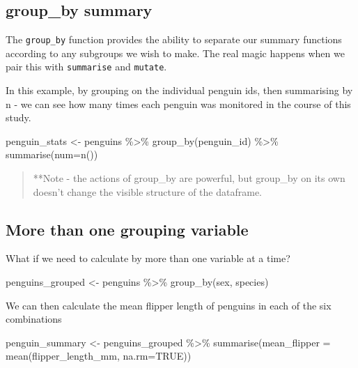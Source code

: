 \documentclass[
]{book}
\newenvironment{Shaded}{\begin{snugshade}}{\end{snugshade}}
\newcommand{\AttributeTok}[1]{\textcolor[rgb]{0.77,0.63,0.00}{#1}}
\newcommand{\ConstantTok}[1]{\textcolor[rgb]{0.00,0.00,0.00}{#1}}
\newcommand{\FunctionTok}[1]{\textcolor[rgb]{0.00,0.00,0.00}{#1}}
\newcommand{\NormalTok}[1]{#1}
\newcommand{\OtherTok}[1]{\textcolor[rgb]{0.56,0.35,0.01}{#1}}
\newcommand{\SpecialCharTok}[1]{\textcolor[rgb]{0.00,0.00,0.00}{#1}}
\begin{document}
\hypertarget{group_by-summary}{%
\subsection{group\_by summary}\label{group_by-summary}}

The \texttt{group\_by} function provides the ability to separate our summary functions according to any subgroups we wish to make. The real magic happens when we pair this with \texttt{summarise} and \texttt{mutate}.

In this example, by grouping on the individual penguin ids, then summarising by n - we can see how many times each penguin was monitored in the course of this study.

\begin{Shaded}
\begin{Highlighting}[]
\NormalTok{penguin\_stats }\OtherTok{\textless{}{-}}\NormalTok{ penguins }\SpecialCharTok{\%\textgreater{}\%} 
  \FunctionTok{group\_by}\NormalTok{(penguin\_id) }\SpecialCharTok{\%\textgreater{}\%} 
  \FunctionTok{summarise}\NormalTok{(}\AttributeTok{num=}\FunctionTok{n}\NormalTok{())}
\end{Highlighting}
\end{Shaded}

\begin{quote}
**Note - the actions of group\_by are powerful, but group\_by on its own doesn't change the visible structure of the dataframe.
\end{quote}

\hypertarget{more-than-one-grouping-variable}{%
\subsection{More than one grouping variable}\label{more-than-one-grouping-variable}}

What if we need to calculate by more than one variable at a time?

\begin{Shaded}
\begin{Highlighting}[]
\NormalTok{penguins\_grouped }\OtherTok{\textless{}{-}}\NormalTok{ penguins }\SpecialCharTok{\%\textgreater{}\%} 
  \FunctionTok{group\_by}\NormalTok{(sex, species)}
\end{Highlighting}
\end{Shaded}

We can then calculate the mean flipper length of penguins in each of the six combinations

\begin{Shaded}
\begin{Highlighting}[]
\NormalTok{penguin\_summary }\OtherTok{\textless{}{-}}\NormalTok{ penguins\_grouped }\SpecialCharTok{\%\textgreater{}\%} 
\FunctionTok{summarise}\NormalTok{(}\AttributeTok{mean\_flipper =} \FunctionTok{mean}\NormalTok{(flipper\_length\_mm, }\AttributeTok{na.rm=}\ConstantTok{TRUE}\NormalTok{))}
\end{Highlighting}
\end{Shaded}
\end{document}
